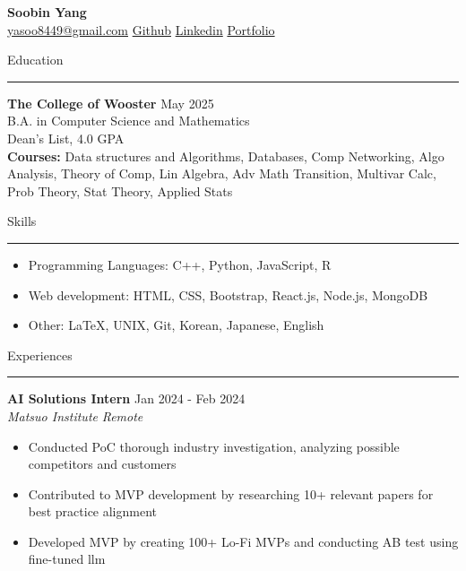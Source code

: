 \documentclass[a4paper,12pt]{article}
\begin{document}
\linespread{1}\selectfont
{}
\newcommand{\sectionrule}[1]{
  \vspace{5pt}
  \RaggedRight
  \textnormal{#1}
  \hrule
  \vspace{3pt}
}
\pagestyle{empty}

\begin{center}
    \textbf{\Large Soobin Yang}\\
    \faEnvelope \href{mailto:yasoo8449@gmail.com}{yasoo8449@gmail.com} \hspace{1pt}
    \faGithubSquare \href{https://github.com/uliba3}{Github} \hspace{1pt}
    \faLinkedinSquare \href{https://linkedin.com/in/soobinyang8449}{Linkedin} \hspace{1pt}
    \faGlobe \href{https://uliba3.github.io/portfolio/}{Portfolio}
\end{center}

\vspace{-20pt}

\sectionrule{Education}
\textbf{The College of Wooster} \hfill \textnormal{May 2025}\\
\textnormal{B.A. in Computer Science and Mathematics}\\
\textnormal{Dean's List, 4.0 GPA}\\
\textbf{Courses:} \textnormal{Data structures and Algorithms, Databases, Comp Networking, Algo Analysis, Theory of Comp, Lin Algebra, Adv Math Transition, Multivar Calc, Prob Theory, Stat Theory, Applied Stats}


\sectionrule{Skills}
\begin{itemize}
    \item \textnormal{Programming Languages:} C++, Python, JavaScript, R
    \item \textnormal{Web development:} HTML, CSS, Bootstrap, React.js, Node.js, MongoDB
    \item \textnormal{Other:} LaTeX, UNIX, Git, Korean, Japanese, English
\end{itemize}

\sectionrule{Experiences}
\textbf{AI Solutions Intern} \hfill \textnormal{Jan 2024 - Feb 2024}\\
\textit{Matsuo Institute} \hfill \textit{Remote}
\begin{itemize}
    \item Conducted PoC thorough industry investigation, analyzing possible competitors and customers
    \item Contributed to MVP development by researching 10+ relevant papers for best practice alignment
    \item Developed MVP by creating 100+ Lo-Fi MVPs and conducting AB test using fine-tuned llm
\end{itemize}
\end{document}
